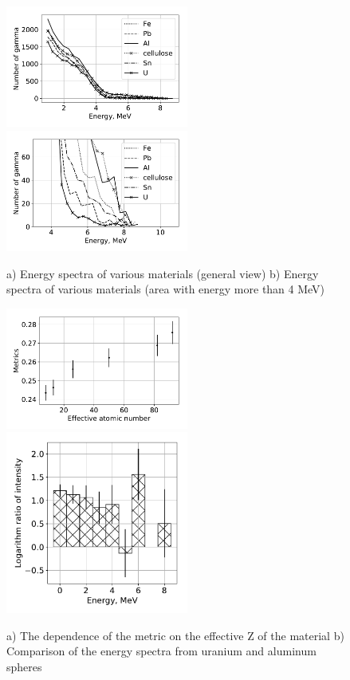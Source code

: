 \documentclass[a4paper]{panl}
\begin{document}
\begin{figure}[t]
    \begin{center} 
        \includegraphics[width=60mm]{figures/diffmat0.pdf} 
        \includegraphics[width=60mm]{figures/diffmat.pdf}  
        \vspace{-3mm}
        \caption{a) Energy spectra of various materials (general view) 
        b) Energy spectra of various materials (area with energy more than 4 MeV)}
    \end{center}
    \vspace{-5mm}
\end{figure}
\begin{figure}[t]
    \begin{center}
        \includegraphics[width=60mm]{figures/diffmat1.pdf} 
        \includegraphics[width=60mm]{figures/Difference.pdf}  
        \vspace{-3mm}
        \caption{a) The dependence of the metric on the effective Z of the material
 b) Comparison of the energy spectra from uranium and aluminum spheres}
    \end{center}
    \vspace{-5mm}
\end{figure}
\end{document}
